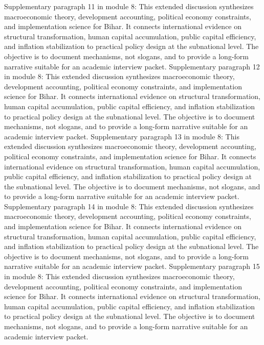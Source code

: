\documentclass[preprint,12pt]{elsarticle}
\begin{document}
Supplementary paragraph 11 in module 8: This extended discussion synthesizes macroeconomic theory, development accounting, political economy constraints, and implementation science for Bihar. It connects international evidence on structural transformation, human capital accumulation, public capital efficiency, and inflation stabilization to practical policy design at the subnational level. The objective is to document mechanisms, not slogans, and to provide a long-form narrative suitable for an academic interview packet.
Supplementary paragraph 12 in module 8: This extended discussion synthesizes macroeconomic theory, development accounting, political economy constraints, and implementation science for Bihar. It connects international evidence on structural transformation, human capital accumulation, public capital efficiency, and inflation stabilization to practical policy design at the subnational level. The objective is to document mechanisms, not slogans, and to provide a long-form narrative suitable for an academic interview packet.
Supplementary paragraph 13 in module 8: This extended discussion synthesizes macroeconomic theory, development accounting, political economy constraints, and implementation science for Bihar. It connects international evidence on structural transformation, human capital accumulation, public capital efficiency, and inflation stabilization to practical policy design at the subnational level. The objective is to document mechanisms, not slogans, and to provide a long-form narrative suitable for an academic interview packet.
Supplementary paragraph 14 in module 8: This extended discussion synthesizes macroeconomic theory, development accounting, political economy constraints, and implementation science for Bihar. It connects international evidence on structural transformation, human capital accumulation, public capital efficiency, and inflation stabilization to practical policy design at the subnational level. The objective is to document mechanisms, not slogans, and to provide a long-form narrative suitable for an academic interview packet.
Supplementary paragraph 15 in module 8: This extended discussion synthesizes macroeconomic theory, development accounting, political economy constraints, and implementation science for Bihar. It connects international evidence on structural transformation, human capital accumulation, public capital efficiency, and inflation stabilization to practical policy design at the subnational level. The objective is to document mechanisms, not slogans, and to provide a long-form narrative suitable for an academic interview packet.
\end{document}
